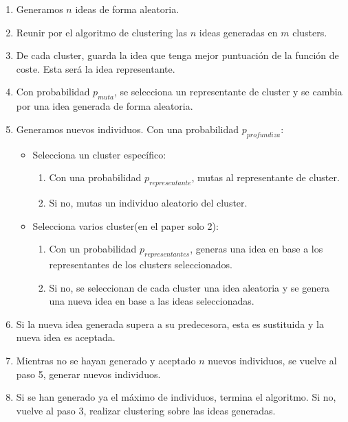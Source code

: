 \begin{enumerate}
	\item Generamos $n$ ideas de forma aleatoria.
	
	\item Reunir por el algoritmo de clustering las $n$ ideas generadas en $m$ clusters.
	
	\item De cada cluster, guarda la idea que tenga mejor puntuación de la función de coste. Esta será la idea representante.
	
	\item Con probabilidad $p_{muta}$, se selecciona un representante de cluster y se cambia por una idea generada de forma aleatoria.
	
	\item Generamos nuevos individuos. Con una probabilidad $p_{profundiza}$:
	
	\begin{itemize}
		\item Selecciona un cluster específico:\\
		\begin{enumerate}
			\item Con una probabilidad $p_{representante}$, mutas al representante de cluster.
			\item Si no, mutas un individuo aleatorio del cluster.
		\end{enumerate}
		
		\item Selecciona varios cluster(en el paper solo 2):\\
		\begin{enumerate}
			\item Con un probabilidad $p_{representantes}$, generas una idea en base a los representantes de los clusters seleccionados.
			\item Si no, se seleccionan de cada cluster una idea aleatoria y se genera una nueva idea en base a las ideas seleccionadas.
		\end{enumerate}
	\end{itemize}
	
	\item Si la nueva idea generada supera a su predecesora, esta es sustituida y la nueva idea es aceptada.
	
	\item Mientras no se hayan generado y aceptado $n$ nuevos individuos, se vuelve al paso 5, generar nuevos individuos.
	
	\item Si se han generado ya el máximo de individuos, termina el algoritmo. Si no, vuelve al paso 3, realizar clustering sobre las ideas generadas.
\end{enumerate}


